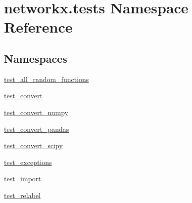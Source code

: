 \hypertarget{namespacenetworkx_1_1tests}{}\section{networkx.\+tests Namespace Reference}
\label{namespacenetworkx_1_1tests}
\subsection*{Namespaces}
\begin{DoxyCompactItemize}
\item 
 \hyperlink{namespacenetworkx_1_1tests_1_1test__all__random__functions}{test\+\_\+all\+\_\+random\+\_\+functions}
\item 
 \hyperlink{namespacenetworkx_1_1tests_1_1test__convert}{test\+\_\+convert}
\item 
 \hyperlink{namespacenetworkx_1_1tests_1_1test__convert__numpy}{test\+\_\+convert\+\_\+numpy}
\item 
 \hyperlink{namespacenetworkx_1_1tests_1_1test__convert__pandas}{test\+\_\+convert\+\_\+pandas}
\item 
 \hyperlink{namespacenetworkx_1_1tests_1_1test__convert__scipy}{test\+\_\+convert\+\_\+scipy}
\item 
 \hyperlink{namespacenetworkx_1_1tests_1_1test__exceptions}{test\+\_\+exceptions}
\item 
 \hyperlink{namespacenetworkx_1_1tests_1_1test__import}{test\+\_\+import}
\item 
 \hyperlink{namespacenetworkx_1_1tests_1_1test__relabel}{test\+\_\+relabel}
\end{DoxyCompactItemize}
